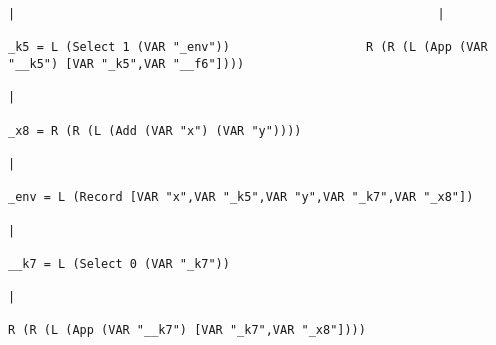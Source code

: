 \begin{landscape}
\begin{lstlisting}[basicstyle=\fontsize{4.5}{5.5}\selectfont\ttfamily]
                                                                                                                                  |                                                           |
                                                                                                                   _k5 = L (Select 1 (VAR "_env"))                   R (R (L (App (VAR "__k5") [VAR "_k5",VAR "__f6"])))
                                                                                                                                  |
                                                                                                              _x8 = R (R (L (Add (VAR "x") (VAR "y"))))
                                                                                                                                  |
                                                                                                  _env = L (Record [VAR "x",VAR "_k5",VAR "y",VAR "_k7",VAR "_x8"])
                                                                                                                                  |
                                                                                                                   __k7 = L (Select 0 (VAR "_k7"))
                                                                                                                                  |
                                                                                                          R (R (L (App (VAR "__k7") [VAR "_k7",VAR "_x8"])))

\end{lstlisting}
\end{landscape}
\clearpage

